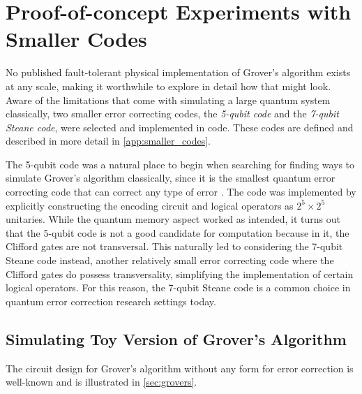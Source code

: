 \section{Proof-of-concept Experiments with Smaller Codes}
No published fault-tolerant physical implementation of Grover's algorithm exists at any scale, making it worthwhile to explore in detail how that might look. Aware of the limitations that come with simulating a large quantum system classically, two smaller error correcting codes, the \emph{5-qubit code} and the \emph{7-qubit Steane code}, were selected and implemented in code. These codes are defined and described in more detail in \cref{app:smaller_codes}.

The 5-qubit code was a natural place to begin when searching for finding ways to simulate Grover's algorithm classically, since it is the smallest quantum error correcting code that can correct any type of error \cite{Nielsen_Chuang_2010}. The code was implemented by explicitly constructing the encoding circuit and logical operators as $2^5 \times 2^5$ unitaries. While the quantum memory aspect worked as intended, it turns out that the 5-qubit code is not a good candidate for computation because in it, the Clifford gates are not transversal. This naturally led to considering the 7-qubit Steane code instead, another relatively small error correcting code where the Clifford gates do possess transversality, simplifying the implementation of certain logical operators. For this reason, the 7-qubit Steane code is a common choice in quantum error correction research settings today.

\subsection{Simulating Toy Version of Grover's Algorithm}
The circuit design for Grover's algorithm without any form for error correction is well-known and is illustrated in \cref{sec:grovers}.

